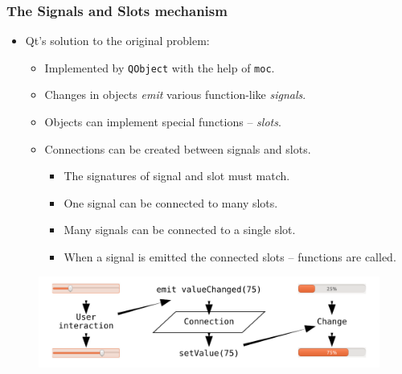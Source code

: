 \begin{frame}
  \frametitle{The Signals and Slots mechanism}
  \small
  \begin{itemize}
    \item Qt's solution to the original problem:
    \begin{itemize}
      \item Implemented by \texttt{QObject} with the help of \texttt{moc}.
      \item Changes in objects {\em emit} various function-like {\em signals}.
      \item Objects can implement special functions -- {\em slots}.
      \item Connections can be created between signals and slots.
      \begin{itemize}
        \footnotesize
        \item The signatures of signal and slot must match.
        \item One signal can be connected to many slots.
        \item Many signals can be connected to a single slot.
        \item When a signal is emitted the connected slots -- functions are called.
      \end{itemize}
    \end{itemize}
  \end{itemize}
  \begin{figure}[!t]
  \centering
  \includegraphics[width=\textwidth]{images/sig_slot_diag2.pdf}
  \end{figure}
\end{frame}

